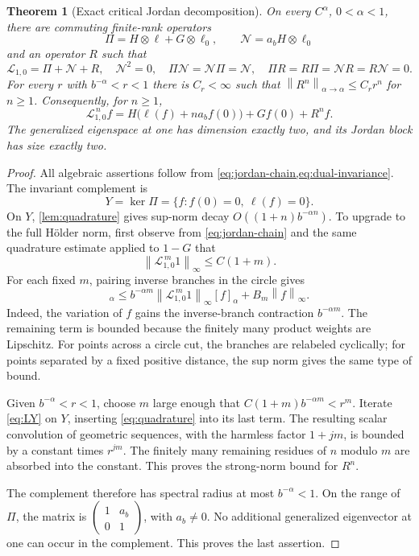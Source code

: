 \documentclass[11pt,a4paper]{article}
\numberwithin{equation}{section}
\newtheorem{theorem}{Theorem}[section]
\theoremstyle{definition}
\theoremstyle{remark}
\newcommand{\Lop}{\mathcal L}
\newcommand{\Proj}{\Pi}
\newcommand{\norm}[1]{\left\lVert#1\right\rVert}
\begin{document}
\begin{theorem}[Exact critical Jordan decomposition]
\label{thm:jordan}
On every $C^\alpha$, $0<\alpha<1$, there are commuting finite-rank
operators
\[
 \Proj=H\otimes\ell+G\otimes\ell_0,
 \qquad \mathcal N=a_bH\otimes\ell_0
\]
and an operator $R$ such that
\begin{equation}
 \Lop_{1,0}=\Proj+\mathcal N+R,\quad
 \mathcal N^2=0,\quad \Proj\mathcal N=\mathcal N\Proj=\mathcal N,
 \quad \Proj R=R\Proj=\mathcal NR=R\mathcal N=0.
 \label{eq:decomposition}
\end{equation}
For every $r$ with $b^{-\alpha}<r<1$ there is $C_r<\infty$ such that
$\norm{R^n}_{\alpha\to\alpha}\le C_rr^n$ for $n\ge1$.
Consequently, for $n\ge1$,
\begin{equation}
 \Lop_{1,0}^{\,n}f=
 H\bigl(\ell(f)+na_bf(0)\bigr)+Gf(0)+R^nf.
 \label{eq:atomic-iterate}
\end{equation}
The generalized eigenspace at one has dimension exactly two, and its
Jordan block has size exactly two.
\end{theorem}
\begin{proof}
All algebraic assertions follow from \cref{eq:jordan-chain,eq:dual-invariance}.
The invariant complement is
\[
 Y=\ker\Proj=\{f:f(0)=0,\ \ell(f)=0\}.
\]
On $Y$, \cref{lem:quadrature} gives sup-norm decay
$O((1+n)b^{-\alpha n})$. To upgrade to the full H\"older norm, first
observe from \cref{eq:jordan-chain} and the same quadrature estimate
applied to $1-G$ that
\begin{equation}
 \norm{\Lop_{1,0}^{\,m}1}_\infty\le C(1+m).
 \label{eq:linear-bound}
\end{equation}
For each fixed $m$, pairing inverse branches in the circle gives
\begin{equation}
 [\Lop_{1,0}^{\,m}f]_\alpha
 \le b^{-\alpha m}\norm{\Lop_{1,0}^{\,m}1}_\infty[f]_\alpha
       +B_m\norm f_\infty.
 \label{eq:LY}
\end{equation}
Indeed, the variation of $f$ gains the inverse-branch contraction
$b^{-\alpha m}$. The remaining term is bounded because the finitely
many product weights are Lipschitz. For points across a circle cut, the
branches are relabeled cyclically; for points separated by a fixed
positive distance, the sup norm gives the same type of bound.

Given $b^{-\alpha}<r<1$, choose $m$ large enough that
$C(1+m)b^{-\alpha m}<r^m$. Iterate \cref{eq:LY} on $Y$, inserting
\cref{eq:quadrature} into its last term. The resulting scalar convolution
of geometric sequences, with the harmless factor $1+jm$, is bounded by
a constant times $r^{jm}$. The finitely many remaining residues of $n$
modulo $m$ are absorbed into the constant. This proves the strong-norm
bound for $R^n$.

The complement therefore has spectral radius at most $b^{-\alpha}<1$.
On the range of $\Proj$, the matrix is
$\left(\begin{smallmatrix}1&a_b\\0&1\end{smallmatrix}\right)$,
with $a_b\ne0$. No additional generalized eigenvector at one can occur
in the complement. This proves the last assertion.
\end{proof}
\end{document}

